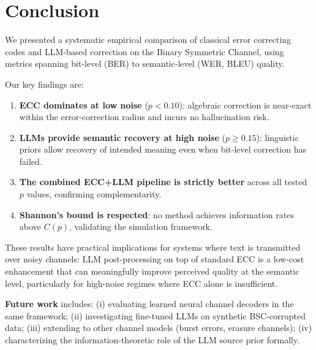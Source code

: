 \section{Conclusion}
\label{sec:conclusion}

We presented a systematic empirical comparison of classical error correcting
codes and LLM-based correction on the Binary Symmetric Channel, using metrics
spanning bit-level (BER) to semantic-level (WER, BLEU) quality.

Our key findings are:
\begin{enumerate}
  \item \textbf{ECC dominates at low noise} ($p < 0.10$): algebraic correction
        is near-exact within the error-correction radius and incurs no
        hallucination risk.
  \item \textbf{LLMs provide semantic recovery at high noise} ($p \geq 0.15$):
        linguistic priors allow recovery of intended meaning even when
        bit-level correction has failed.
  \item \textbf{The combined ECC+LLM pipeline is strictly better} across all
        tested $p$ values, confirming complementarity.
  \item \textbf{Shannon's bound is respected}: no method achieves information
        rates above $C(p)$, validating the simulation framework.
\end{enumerate}

These results have practical implications for systems where text is transmitted
over noisy channels: LLM post-processing on top of standard ECC is a low-cost
enhancement that can meaningfully improve perceived quality at the semantic
level, particularly for high-noise regimes where ECC alone is insufficient.

\textbf{Future work} includes: (i) evaluating learned neural channel decoders
\cite{farsad2018deep} in the same framework; (ii) investigating fine-tuned LLMs
on synthetic BSC-corrupted data; (iii) extending to other channel models
(burst errors, erasure channels); (iv) characterizing the information-theoretic
role of the LLM source prior formally.
